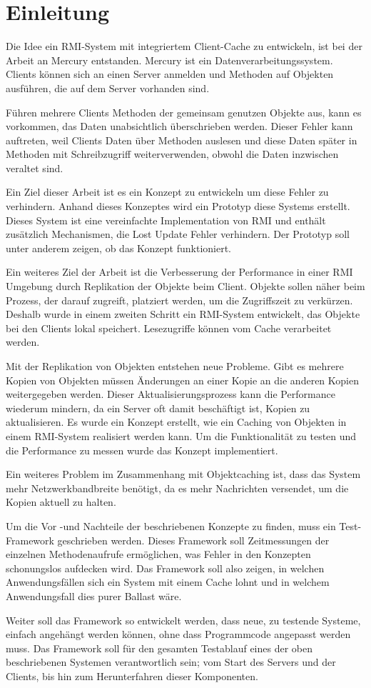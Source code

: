 \chapter{Einleitung}

Die Idee ein RMI-System mit integriertem Client-Cache zu entwickeln, ist bei der Arbeit an Mercury entstanden. Mercury ist ein Datenverarbeitungssystem. Clients können sich an einen Server anmelden und Methoden auf Objekten ausführen, die auf dem Server vorhanden sind. 

Führen mehrere Clients Methoden der gemeinsam genutzen Objekte aus, kann es vorkommen, das Daten unabsichtlich überschrieben werden. Dieser Fehler kann auftreten, weil Clients Daten über Methoden auslesen und diese Daten später in Methoden mit Schreibzugriff weiterverwenden, obwohl die Daten inzwischen veraltet sind.

Ein Ziel dieser Arbeit ist es ein Konzept zu entwickeln um
diese Fehler zu verhindern. Anhand dieses Konzeptes wird ein Prototyp
diese Systems erstellt. Dieses System ist eine vereinfachte
Implementation von RMI und enthält zusätzlich Mechanismen, die Lost
Update Fehler verhindern. Der Prototyp soll unter anderem zeigen, ob
das Konzept funktioniert. 

Ein weiteres Ziel der Arbeit ist die Verbesserung der Performance in einer RMI Umgebung durch Replikation der Objekte beim Client. Objekte sollen näher beim Prozess, der darauf zugreift, platziert werden, um die Zugriffszeit zu verkürzen. Deshalb wurde in einem zweiten Schritt ein RMI-System entwickelt, das Objekte bei den Clients lokal speichert. Lesezugriffe können vom Cache verarbeitet werden.

Mit der Replikation von Objekten entstehen neue Probleme. Gibt es mehrere Kopien von Objekten müssen Änderungen an einer Kopie an die anderen Kopien weitergegeben werden. Dieser Aktualisierungsprozess kann die Performance wiederum mindern, da ein Server oft damit beschäftigt ist, Kopien zu aktualisieren. Es wurde ein Konzept erstellt, wie ein Caching von Objekten in einem RMI-System realisiert werden kann. Um die Funktionalität zu testen und die Performance zu messen wurde das Konzept implementiert. 

Ein weiteres Problem im Zusammenhang mit Objektcaching ist, dass das System mehr Netzwerkbandbreite benötigt, da es mehr Nachrichten versendet, um die Kopien aktuell zu halten.

Um die Vor -und Nachteile der beschriebenen Konzepte zu finden, muss ein Test-Framework geschrieben werden. Dieses Framework soll Zeitmessungen der einzelnen Methodenaufrufe ermöglichen, was Fehler in den Konzepten schonungslos aufdecken wird. Das Framework soll also zeigen, in welchen Anwendungsfällen sich ein System mit einem Cache lohnt und in welchem Anwendungsfall dies purer Ballast wäre.

Weiter soll das Framework so entwickelt werden, dass neue, zu testende Systeme, einfach angehängt werden können, ohne dass Programmcode angepasst werden muss. Das Framework soll für den gesamten Testablauf eines der oben beschriebenen Systemen verantwortlich sein; vom Start des Servers und der Clients, bis hin zum Herunterfahren dieser Komponenten.

